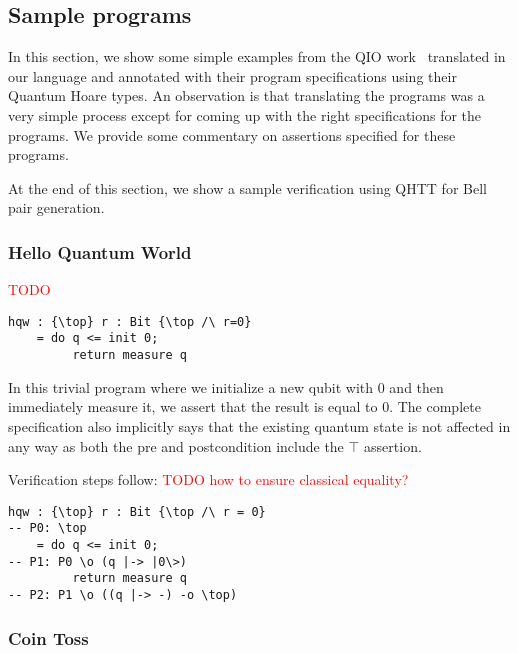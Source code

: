 \documentclass[acmsmall,nonacm,timestamp,review=false,anonymous=false]{acmart}
\newcommand{\todo}[1]{\textcolor{red}{#1}}
\begin{document}
\subsection{Sample programs}
\label{sec:examples}

In this section, we show some simple examples from the QIO work~\cite{qio} translated in our language and annotated with their program specifications using their Quantum Hoare types. An observation is that translating the programs was a very simple process except for coming up with the right specifications for the programs. We provide some commentary on assertions specified for these programs.

At the end of this section, we show a sample verification using QHTT for Bell pair generation.

\subsubsection{Hello Quantum World}
 \todo{TODO}
\leavevmode

\begin{minipage}{0.95\linewidth}
\begin{lstlisting}[language=QHaskell]
hqw : {\top} r : Bit {\top /\ r=0}
    = do q <= init 0;
         return measure q
\end{lstlisting}
\end{minipage}

In this trivial program where we initialize a new qubit with 0 and then immediately measure it, we assert that the result is equal to 0. The complete specification also implicitly says that the existing quantum state is not affected in any way as both the pre and postcondition include the $\top$ assertion.

Verification steps follow:  \todo{TODO how to ensure classical equality?}

\begin{minipage}{0.95\linewidth}
\begin{lstlisting}[language=QHaskell]
hqw : {\top} r : Bit {\top /\ r = 0}
-- P0: \top
    = do q <= init 0;
-- P1: P0 \o (q |-> |0\>)
         return measure q
-- P2: P1 \o ((q |-> -) -o \top)
\end{lstlisting}
\end{minipage}

\subsubsection{Coin Toss}
\leavevmode
\end{document}

